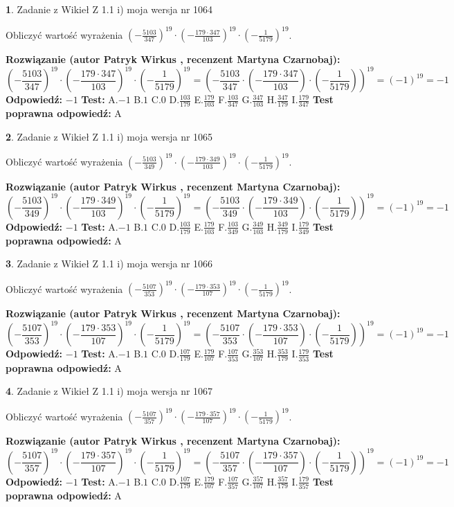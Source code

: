 \documentclass[12pt, a4paper]{article}
\theoremstyle{definition} %
\newtheorem{zad}{}
\newcommand{\zadStart}[1]{\begin{zad}#1\newline}
\newcommand{\zadStop}{\end{zad}}
\newcommand{\rozwStart}[2]{\noindent \textbf{Rozwiązanie (autor #1 , recenzent #2): }\newline}
\newcommand{\rozwStop}{\newline}
\newcommand{\odpStart}{\noindent \textbf{Odpowiedź:}\newline}
\newcommand{\odpStop}{\newline}
\newcommand{\testStart}{\noindent \textbf{Test:}\newline}
\newcommand{\testStop}{\newline}
\newcommand{\kluczStart}{\noindent \textbf{Test poprawna odpowiedź:}\newline}
\newcommand{\kluczStop}{\newline}
\begin{document}
\zadStart{Zadanie z Wikieł Z 1.1 i) moja wersja nr 1064}

Obliczyć wartość wyrażenia $(-\frac{5103}{347})^{19} \cdot (-\frac{179 \cdot 347}{103})^{19} \cdot (-\frac{1}{5179})^{19}$.
\zadStop
\rozwStart{Patryk Wirkus}{Martyna Czarnobaj}
$$(-\frac{5103}{347})^{19} \cdot (-\frac{179 \cdot 347}{103})^{19} \cdot (-\frac{1}{5179})^{19} = (-\frac{5103}{347} \cdot (-\frac{179 \cdot 347}{103}) \cdot (-\frac{1}{5179}))^{19} = (-1)^{19} = -1$$
\rozwStop
\odpStart
$-1$
\odpStop
\testStart
A.$-1$ B.$1$ C.$0$ D.$\frac{103}{179}$ E.$\frac{179}{103}$
F.$\frac{103}{347}$ G.$\frac{347}{103}$
H.$\frac{347}{179}$
I.$\frac{179}{347}$
\testStop
\kluczStart
A
\kluczStop



\zadStart{Zadanie z Wikieł Z 1.1 i) moja wersja nr 1065}

Obliczyć wartość wyrażenia $(-\frac{5103}{349})^{19} \cdot (-\frac{179 \cdot 349}{103})^{19} \cdot (-\frac{1}{5179})^{19}$.
\zadStop
\rozwStart{Patryk Wirkus}{Martyna Czarnobaj}
$$(-\frac{5103}{349})^{19} \cdot (-\frac{179 \cdot 349}{103})^{19} \cdot (-\frac{1}{5179})^{19} = (-\frac{5103}{349} \cdot (-\frac{179 \cdot 349}{103}) \cdot (-\frac{1}{5179}))^{19} = (-1)^{19} = -1$$
\rozwStop
\odpStart
$-1$
\odpStop
\testStart
A.$-1$ B.$1$ C.$0$ D.$\frac{103}{179}$ E.$\frac{179}{103}$
F.$\frac{103}{349}$ G.$\frac{349}{103}$
H.$\frac{349}{179}$
I.$\frac{179}{349}$
\testStop
\kluczStart
A
\kluczStop



\zadStart{Zadanie z Wikieł Z 1.1 i) moja wersja nr 1066}

Obliczyć wartość wyrażenia $(-\frac{5107}{353})^{19} \cdot (-\frac{179 \cdot 353}{107})^{19} \cdot (-\frac{1}{5179})^{19}$.
\zadStop
\rozwStart{Patryk Wirkus}{Martyna Czarnobaj}
$$(-\frac{5107}{353})^{19} \cdot (-\frac{179 \cdot 353}{107})^{19} \cdot (-\frac{1}{5179})^{19} = (-\frac{5107}{353} \cdot (-\frac{179 \cdot 353}{107}) \cdot (-\frac{1}{5179}))^{19} = (-1)^{19} = -1$$
\rozwStop
\odpStart
$-1$
\odpStop
\testStart
A.$-1$ B.$1$ C.$0$ D.$\frac{107}{179}$ E.$\frac{179}{107}$
F.$\frac{107}{353}$ G.$\frac{353}{107}$
H.$\frac{353}{179}$
I.$\frac{179}{353}$
\testStop
\kluczStart
A
\kluczStop



\zadStart{Zadanie z Wikieł Z 1.1 i) moja wersja nr 1067}

Obliczyć wartość wyrażenia $(-\frac{5107}{357})^{19} \cdot (-\frac{179 \cdot 357}{107})^{19} \cdot (-\frac{1}{5179})^{19}$.
\zadStop
\rozwStart{Patryk Wirkus}{Martyna Czarnobaj}
$$(-\frac{5107}{357})^{19} \cdot (-\frac{179 \cdot 357}{107})^{19} \cdot (-\frac{1}{5179})^{19} = (-\frac{5107}{357} \cdot (-\frac{179 \cdot 357}{107}) \cdot (-\frac{1}{5179}))^{19} = (-1)^{19} = -1$$
\rozwStop
\odpStart
$-1$
\odpStop
\testStart
A.$-1$ B.$1$ C.$0$ D.$\frac{107}{179}$ E.$\frac{179}{107}$
F.$\frac{107}{357}$ G.$\frac{357}{107}$
H.$\frac{357}{179}$
I.$\frac{179}{357}$
\testStop
\kluczStart
A
\kluczStop
\end{document}

